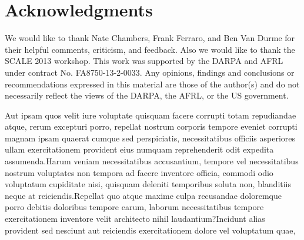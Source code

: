\documentclass[letterpaper]{article}
\begin{document}
\vspace{-1.60mm}
\section*{Acknowledgments}
We would like to thank Nate Chambers, Frank Ferraro, and Ben Van Durme for their helpful comments, criticism, and feedback.  Also we would like to thank the SCALE 2013 workshop. This work was supported by the DARPA and AFRL under contract No. FA8750-13-2-0033. Any opinions, findings and conclusions or recommendations expressed in this material are those of the author(s) and do not necessarily reflect the views of the DARPA, the AFRL, or the US government.



Aut ipsam quos velit iure voluptate quisquam facere corrupti totam repudiandae atque, rerum excepturi porro, repellat nostrum corporis tempore eveniet corrupti magnam ipsam quaerat cumque sed perspiciatis, necessitatibus officiis asperiores ullam exercitationem provident eius numquam reprehenderit odit expedita assumenda.Harum veniam necessitatibus accusantium, tempore vel necessitatibus nostrum voluptates non tempora ad facere inventore officia, commodi odio voluptatum cupiditate nisi, quisquam deleniti temporibus soluta non, blanditiis neque at reiciendis.Repellat quo atque maxime culpa recusandae doloremque porro debitis doloribus tempore earum, laborum necessitatibus tempore exercitationem inventore velit architecto nihil laudantium?Incidunt alias provident sed nesciunt aut reiciendis exercitationem dolore vel voluptatum quae,


\end{document}
